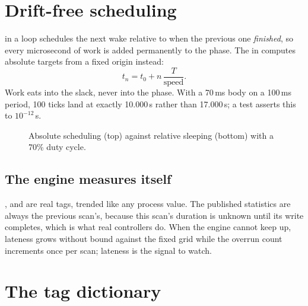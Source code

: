 \section{Drift-free scheduling}

 in a loop schedules the next wake relative
to when the previous one \emph{finished}, so every microsecond of work is
added permanently to the phase. The  in 
computes absolute targets from a fixed origin instead:
\begin{equation}
  t_n = t_0 + n\,\frac{T}{\text{speed}} .
\end{equation}
Work eats into the slack, never into the phase. With a 70\,ms body on a
100\,ms period, 100 ticks land at exactly 10.000\,s rather than 17.000\,s; a
test asserts this to $10^{-12}$\,s.

\begin{figure}[htbp]
\centering
{}
\caption{Absolute scheduling (top) against relative sleeping (bottom) with a
70\% duty cycle.}
\label{fig:ticker}
\end{figure}

\subsection{The engine measures itself}
,  and  are real tags, trended
like any process value. The published statistics are always the previous
scan's, because this scan's duration is unknown until its write completes,
which is what real controllers do. When the engine cannot keep up, lateness
grows without bound against the fixed grid while the overrun count increments
once per scan; lateness is the signal to watch.

\section{The tag dictionary}

